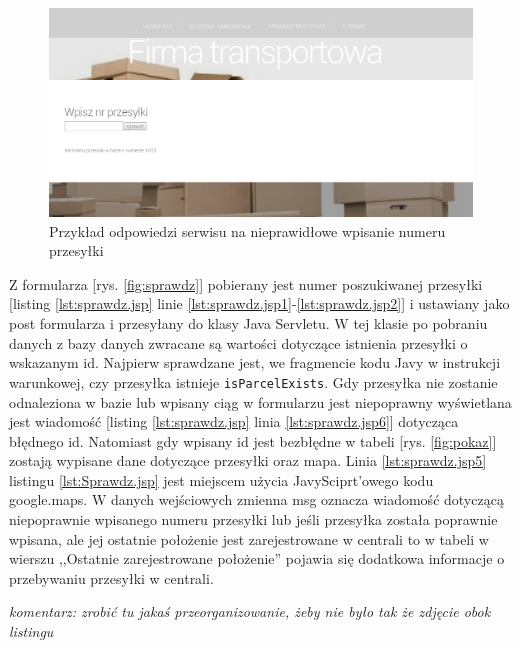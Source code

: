 \documentclass[eng,printmode,oneside]{mgr}
\begin{document}
\begin{figure}[ht!]
\centering
\includegraphics[width=\textwidth]{nieMaPrzesylki.png}
\caption{Przykład odpowiedzi serwisu na nieprawidłowe wpisanie numeru przesyłki}
\label{fig:niema}
\end{figure}


Z formularza [rys. \ref{fig:sprawdz}] pobierany jest numer poszukiwanej
przesyłki [listing \ref{lst:sprawdz.jsp} linie
\ref{lst:sprawdz.jsp1}-\ref{lst:sprawdz.jsp2}] i ustawiany jako post formularza i przesyłany do klasy Java Servletu. W tej klasie po
pobraniu danych z bazy danych zwracane są wartości dotyczące istnienia przesyłki
o wskazanym id. Najpierw sprawdzane jest, we fragmencie kodu Javy w instrukcji
warunkowej, czy przesyłka istnieje \texttt{isParcelExists}. Gdy przesyłka
nie zostanie odnaleziona w bazie lub wpisany ciąg w formularzu jest niepoprawny
wyświetlana jest wiadomość [listing \ref{lst:sprawdz.jsp} linia
\ref{lst:sprawdz.jsp6}] dotycząca błędnego id. Natomiast gdy wpisany id jest
bezbłędne w tabeli [rys.
\ref{fig:pokaz}] zostają wypisane dane dotyczące przesyłki oraz mapa. Linia
\ref{lst:sprawdz.jsp5} listingu \ref{lst:Sprawdz.jsp} jest miejscem użycia
JavySciprt'owego kodu google.maps. W danych wejściowych zmienna msg oznacza wiadomość dotyczącą
niepoprawnie wpisanego numeru przesyłki lub jeśli przesyłka została poprawnie
wpisana, ale jej ostatnie położenie jest zarejestrowane w centrali to w tabeli
w wierszu ,,Ostatnie zarejestrowane położenie'' pojawia się dodatkowa informacje
o przebywaniu przesyłki w centrali.

\emph{\color{komentarz}komentarz: zrobić tu jakaś przeorganizowanie, żeby nie
było tak że zdjęcie obok listingu}
\end{document}
